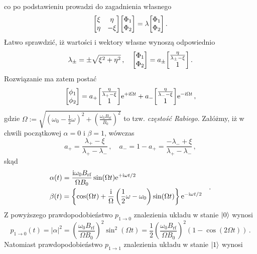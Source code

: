 \documentclass{myclass}
\begin{document}
co po podstawieniu prowadzi do zagadnienia własnego
\begin{equation*}
    \mqty[\xi & \eta \\ \eta & -\xi]\mqty[\Phi_1 \\ \Phi_2] = \lambda \mqty[\Phi_1 \\ \Phi_2]\,.
\end{equation*}
Łatwo sprawdzić, iż wartości i wektory własne wynoszą odpowiednio
\begin{equation*}
    \lambda_\pm = \pm \sqrt{\xi^2 + \eta^2}\,,\quad \mqty[\Phi_1 \\ \Phi_2] = a_\pm\mqty[\frac{\eta}{\lambda_\pm - \xi} \\ 1]\,.
\end{equation*}
Rozwiązanie ma zatem postać
\begin{equation*}
    \mqty[\phi_1 \\ \phi_2] = a_+\mqty[\frac{\eta}{\lambda_+-\xi}\\1]\e^{+\im\Omega t} + a_-\mqty[\frac{\eta}{\lambda_--\xi}\\1]\e^{-\im\Omega t}\,,
\end{equation*}
gdzie \(\boxed{\Omega := \sqrt{\left(\omega_0 - \frac{1}{2}\omega\right)^2 +
\left(\frac{\omega_0B_\text{rf}}{B_0}\right)^2}}\) to tzw. \textit{częstość Rabiego}. Załóżmy, iż w
chwili początkowej \(\alpha = 0\) i \(\beta = 1\), wówczas
\begin{equation*}
    a_+ = \frac{\lambda_+ - \xi}{\lambda_+ - \lambda_-}\,,\quad a_- = 1 - a_+ = \frac{-\lambda_-+\xi}{\lambda_+ - \lambda_-}\,,
\end{equation*}
skąd
\begin{equation*}
    \begin{split}
        &\alpha(t) = \frac{\mathrm{i}\omega_0B_\text{rf}}{\Omega B_0}\sin(\Omega t)\mathrm{e}^{+\mathrm{i}\omega t/2}\\
        &\beta(t) = \left\{\cos(\Omega t) +\frac{\mathrm{i}}{\Omega}\left(\frac{1}{2}\omega - \omega_0\right)\sin(\Omega t)\right\}\mathrm{e}^{-\mathrm{i}\omega t/2}
    \end{split}\quad.
\end{equation*}
Z powyższego prawdopodobieństwo \(p_{1\to0}\) znalezienia układu w stanie \(\ket{0}\) wynosi
\begin{equation*}
        p_{1\to0}(t) = |\alpha|^2 = \left(\frac{\omega_0B_\text{rf}}{\Omega B_0}\right)^2\sin^2(\Omega t) = \frac{1}{2}\left(\frac{\omega_0B_\text{rf}}{\Omega B_0}\right)^2(1-\cos(2\Omega t))\,.
\end{equation*}
Natomiast prawdopodobieństwo \(p_{1\to1}\) znalezienia układu w stanie \(\ket{1}\) wynosi
\end{document}
